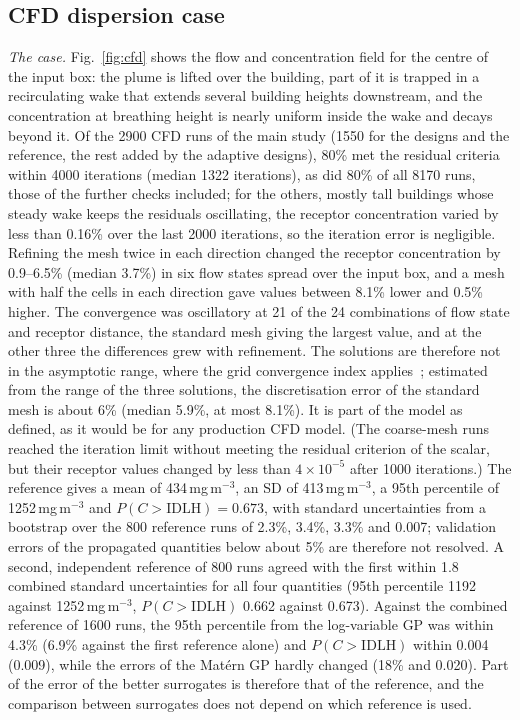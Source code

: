 
\subsection{CFD dispersion case}
\label{sec:res-cfd}
\emph{The case.} Fig.~\ref{fig:cfd} shows the flow and concentration field
for the centre of the input box: the plume is lifted over the building,
part of it is trapped in a recirculating wake that extends several building
heights downstream, and the concentration at breathing height is nearly
uniform inside the wake and decays beyond it. Of the 2900 CFD runs of the
main study (1550 for the designs and the reference, the rest added by the
adaptive designs), 80\% met the residual criteria within 4000
iterations (median 1322
iterations), as did 80\% of all 8170 runs, those of the further checks
included; for the others, mostly tall buildings whose steady wake keeps
the residuals oscillating, the receptor concentration varied by less than
0.16\% over the last 2000 iterations, so the iteration error is negligible.
Refining the mesh twice in each direction changed the receptor
concentration by 0.9--6.5\% (median 3.7\%) in six flow states spread over
the input box, and a mesh with half the cells in each direction gave values
between 8.1\% lower and 0.5\% higher. The convergence was oscillatory at 21
of the 24 combinations of flow state and receptor distance, the standard
mesh giving the largest value, and at the other three the differences grew
with refinement. The solutions are therefore not in the asymptotic range,
where the grid convergence index applies~\cite{celik2008}; estimated from
the range of the three solutions, the discretisation error of the standard
mesh is about 6\% (median 5.9\%, at most 8.1\%). It is part of the model
as defined, as it would be for any production CFD model. (The coarse-mesh
runs reached the iteration limit without meeting the residual criterion
of the scalar, but their receptor values changed by less than
$4\times10^{-5}$ after 1000 iterations.) The reference gives
a mean of 434\,mg\,m$^{-3}$, an SD of 413\,mg\,m$^{-3}$, a 95th percentile
of 1252\,mg\,m$^{-3}$ and $P(C>\mathrm{IDLH})=0.673$, with standard
uncertainties from a bootstrap over the 800 reference runs of 2.3\%,
3.4\%, 3.3\% and 0.007; validation errors of the propagated quantities
below about 5\% are therefore not resolved. A second, independent reference
of 800 runs agreed with the first within 1.8 combined standard
uncertainties for all four quantities (95th percentile 1192 against
1252\,mg\,m$^{-3}$, $P(C>\mathrm{IDLH})$ 0.662 against 0.673). Against the
combined reference of 1600 runs, the 95th percentile from the log-variable
GP was within 4.3\% (6.9\% against the first reference alone) and
$P(C>\mathrm{IDLH})$ within 0.004 (0.009), while the errors of the Mat\'ern
GP hardly changed (18\% and 0.020). Part of the error of the better
surrogates is therefore that of the reference, and the comparison between
surrogates does not depend on which reference is used.

